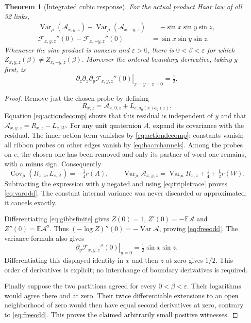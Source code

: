 \documentclass[11pt]{article}
\newtheorem{theorem}{Theorem}[section]\newtheorem{lemma}[theorem]{Lemma}
\begin{document}
\begin{theorem}[Integrated cubic response]\label{thm:integrated}
For the actual product Haar law of all 32 links,
\begin{align}
 \operatorname{Var}_\mu(\mathcal A_{x,y,z})
  -\operatorname{Var}_\mu(\mathcal A_{x,-y,z})
       &=-\sin x\sin y\sin z,\label{eq:varodd}\\
 \mathcal F_{x,y,z}''(0)-\mathcal F_{x,-y,z}''(0)
       &=\sin x\sin y\sin z.\label{eq:freeodd}
\end{align}
Whenever the sine product is nonzero and $\varepsilon>0$, there is
$0<\beta<\varepsilon$ for which $Z_{x,y,z}(\beta)\ne Z_{x,-y,z}(\beta)$.
Moreover the ordered boundary derivative, taking $y$ first, is
\[
 \left.\partial_z\partial_x\partial_y
              \mathcal F_{x,y,z}''(0)\right|_{x=y=z=0}=\tfrac12.
\]
\end{theorem}
\begin{proof}
Remove just the chosen probe by defining
\[
 R_{x,z}=\mathcal A_{x,0,z}+L_{e,a_0(x)a_2(z)}.
\]
Equation \eqref{eq:actiondecomp} shows that this residual is independent
of $y$ and that $\mathcal A_{x,y,z}=R_{x,z}-L_{e,W}$.
For any unit quaternion $A$, expand its covariance with the residual.
The inner-action term vanishes by \eqref{eq:actiondecomp}; constants
vanish; all ribbon probes on other edges vanish by \eqref{eq:haarchannels}.
Among the probes on $e$, the chosen one has been removed and only its
partner of word one remains, with a minus sign. Consequently
\[
 \operatorname{Cov}_\mu(R_{x,z},L_{e,A})=-\tfrac14r(A),
 \qquad
 \operatorname{Var}_\mu\mathcal A_{x,y,z}
      =\operatorname{Var}_\mu R_{x,z}+\tfrac14+\tfrac12r(W).
\]
Subtracting the expression with $y$ negated and using
\eqref{eq:tripletrace} proves \eqref{eq:varodd}. The constant internal
variance was never discarded or approximated; it cancels exactly.

Differentiating \eqref{eq:gibbsfinite} gives $Z(0)=1$,
$Z'(0)=-\mathbb E\mathcal A$ and $Z''(0)=\mathbb E\mathcal A^2$.
Thus $(-\log Z)''(0)=-\operatorname{Var}\mathcal A$, proving
\eqref{eq:freeodd}. The variance formula also gives
\[
 \left.\partial_y\mathcal F_{x,y,z}''(0)\right|_{y=0}
            =\tfrac12\sin x\sin z.
\]
Differentiating this displayed identity in $x$ and then $z$ at zero
gives $1/2$. This order of derivatives is explicit; no interchange
of boundary derivatives is required.

Finally suppose the two partitions agreed for every $0<\beta<\varepsilon$.
Their logarithms would agree there and at zero. Their twice differentiable
extensions to an open neighborhood of zero would then have equal second
derivatives at zero, contrary to \eqref{eq:freeodd}. This proves the
claimed arbitrarily small positive witnesses.
\end{proof}
\end{document}
